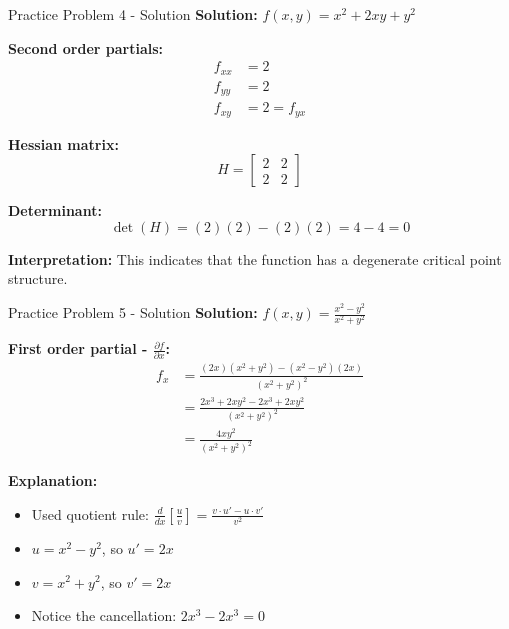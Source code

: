 \documentclass[aspectratio=169]{beamer}
\begin{document}
\begin{frame}{Practice Problem 4 - Solution}
\textbf{Solution:} $f(x,y) = x^2 + 2xy + y^2$

\textbf{Second order partials:}
\begin{align*}
    f_{xx} &= 2 \\
    f_{yy} &= 2 \\
    f_{xy} &= 2 = f_{yx}
\end{align*}

\textbf{Hessian matrix:}
\[H = \begin{bmatrix} 
2 & 2 \\
2 & 2
\end{bmatrix}\]

\textbf{Determinant:}
\[\det(H) = (2)(2) - (2)(2) = 4 - 4 = 0\]

\textbf{Interpretation:} This indicates that the function has a degenerate critical point structure.
\end{frame}

\begin{frame}{Practice Problem 5 - Solution}
\textbf{Solution:} $f(x,y) = \frac{x^2 - y^2}{x^2 + y^2}$

\textbf{First order partial - $\frac{\partial f}{\partial x}$:}
\begin{align*}
    f_x &= \frac{(2x)(x^2 + y^2) - (x^2 - y^2)(2x)}{(x^2 + y^2)^2} \\
    &= \frac{2x^3 + 2xy^2 - 2x^3 + 2xy^2}{(x^2 + y^2)^2} \\
    &= \frac{4xy^2}{(x^2 + y^2)^2}
\end{align*}

\textbf{Explanation:}
\begin{itemize}
    \item Used quotient rule: $\frac{d}{dx}\left[\frac{u}{v}\right] = \frac{v \cdot u' - u \cdot v'}{v^2}$
    \item $u = x^2 - y^2$, so $u' = 2x$
    \item $v = x^2 + y^2$, so $v' = 2x$
    \item Notice the cancellation: $2x^3 - 2x^3 = 0$
\end{itemize}
\end{frame}
\end{document}
